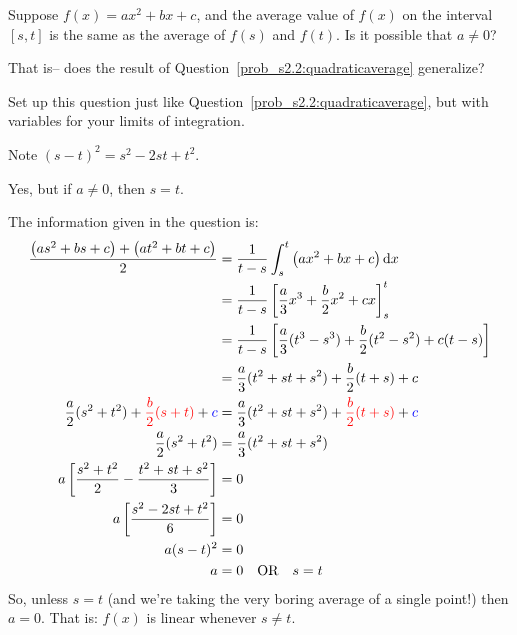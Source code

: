 \begin{question}
Suppose $f(x)=ax^2+bx+c$, and the average value of $f(x)$ on the interval $[s,t]$ is the same as the average of $f(s)$ and $f(t)$. Is it possible that $a \neq 0$?

That is--
does the result of Question~\ref{prob_s2.2:quadraticaverage} generalize?
\end{question}
\begin{hint}
Set up this question just like Question~\ref{prob_s2.2:quadraticaverage}, but with variables for your limits of integration.

Note $(s-t)^2=s^2-2st+t^2$.
\end{hint}
\begin{answer}
Yes, but if $a\neq0$, then $s=t$.
\end{answer}
\begin{solution}
The information given in the question is:
\begin{align*}
\frac{\big(as^2+bs+c\big)+\big(at^2+bt+c\big)}{2}&=\frac{1}{t-s}\int_s^t \big(ax^2+bx+c\big)\,\mathrm{d}x\\
&=\frac{1}{t-s}\left[\frac{a}{3}x^3+\frac{b}{2}x^2+cx\right]_s^t
\\&=\frac{1}{t-s}\left[\frac{a}{3}(t^3-s^3)+\frac{b}{2}(t^2-s^2)+c(t-s)\right]\\
&=\frac{a}{3}(t^2+st+s^2)+\frac{b}{2}(t+s)+c\\
\frac{a}{2}(s^2+t^2) +\textcolor{red}{ \frac{b}{2}(s+t)}+\textcolor{blue}{c}&=\frac{a}{3}(t^2+st+s^2)+\textcolor{red}{\frac{b}{2}(t+s)}+\textcolor{blue}{c}\\
\frac{a}{2}(s^2+t^2)&=\frac{a}{3}(t^2+st+s^2)\\
a\left[\frac{s^2+t^2}{2} - \frac{t^2+st+s^2}{3}\right]&=0\\
a\left[\frac{s^2-2st+t^2}{6}\right]&=0
\\a(s-t)^2&=0\\
a&=0 \quad\text{OR}\quad s=t
\end{align*}
So, unless $s=t$ (and we're taking the very boring average of a single point!) then $a=0$. That is: $f(x)$ is linear whenever $s \neq t$.
\end{solution}


